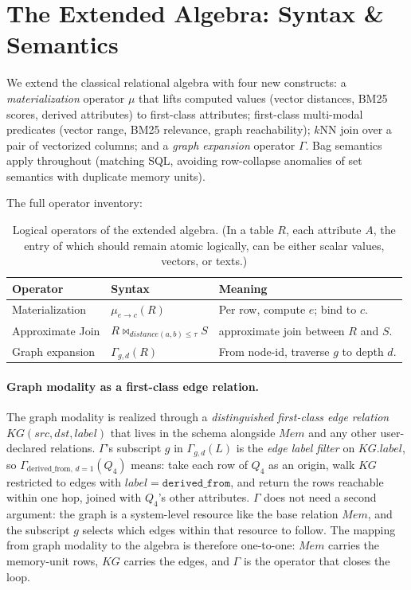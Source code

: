 \documentclass[sigconf]{acmart}
\theoremstyle{plain}
\theoremstyle{definition}
\newcommand{\Mem}{\mathit{Mem}}
\newcommand{\KG}{\mathit{KG}}
\theoremstyle{remark}
\begin{document}
\section{The Extended Algebra: Syntax \& Semantics}\label{sec:algebra}

We extend the classical relational algebra with four new constructs: a \emph{materialization} operator $\mu$ that lifts computed values (vector distances, BM25 scores, derived attributes) to first-class attributes; first-class multi-modal predicates
(vector range, BM25 relevance, graph reachability); $k$NN join over a pair of vectorized columns; and a \emph{graph expansion} operator $\Gamma$. Bag semantics apply throughout (matching SQL, avoiding row-collapse anomalies of set semantics with duplicate memory units). 

The full operator inventory:

\begin{table}[t]
  \centering
  \scriptsize
  \caption{Logical operators of the extended algebra. (In a table $R$, each attribute $A$, the entry of which should remain atomic logically, can be either scalar values, vectors, or texts.)}
  \label{tab:ops}
  \begin{tabular}{@{}p{2.0cm}p{2.6cm}p{3.1cm}@{}}
    \toprule
    Operator & Syntax & Meaning \\
    \midrule
    Materialization & $\mu_{e\to c}(R)$ & Per row, compute $e$; bind to $c$. \\
    Approximate Join & $R \bowtie_{distance(a,b)\le\tau} S$ & approximate join between $R$ and $S$. \\
    Graph expansion & $\Gamma_{g,d}(R)$ & From node-id, traverse $g$ to depth $d$. \\
    \bottomrule
  \end{tabular}
\end{table}

\paragraph{Graph modality as a first-class edge relation.}
The graph modality is realized through a \emph{distinguished first-class edge relation} $\KG(\mathit{src}, \mathit{dst}, \mathit{label})$ that lives in the schema alongside $\Mem$ and any other user-declared relations. $\Gamma$'s subscript $g$ in $\Gamma_{g,d}(L)$ is the \emph{edge label filter} on $\KG.label$, so $\Gamma_{\mathrm{derived\_from},\,d=1}(Q_4)$ means: take each row of $Q_4$ as an origin, walk $\KG$ restricted to edges with $\mathit{label}=\texttt{derived\_from}$, and return the rows reachable within one hop, joined with $Q_4$'s other attributes. $\Gamma$ does not need a second argument: the graph is a system-level resource like the base relation $\Mem$, and the subscript $g$ selects which edges within that resource to follow. The mapping from graph modality to the algebra is therefore one-to-one: $\Mem$ carries the memory-unit rows, $\KG$ carries the edges, and $\Gamma$ is the operator that closes the loop.
\end{document}
